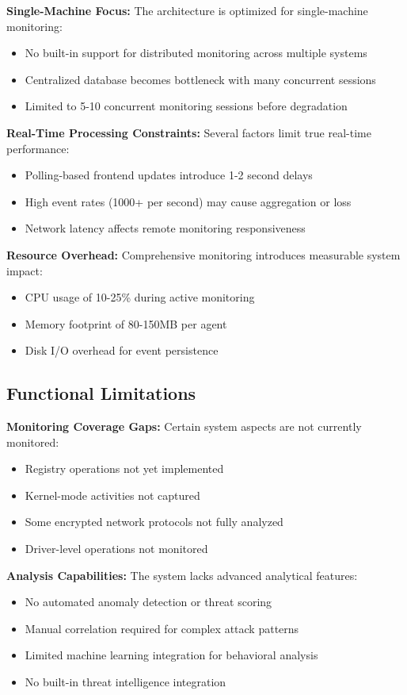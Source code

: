 \textbf{Single-Machine Focus:}
The architecture is optimized for single-machine monitoring:
\begin{itemize}
    \item No built-in support for distributed monitoring across multiple systems
    \item Centralized database becomes bottleneck with many concurrent sessions
    \item Limited to 5-10 concurrent monitoring sessions before degradation
\end{itemize}

\textbf{Real-Time Processing Constraints:}
Several factors limit true real-time performance:
\begin{itemize}
    \item Polling-based frontend updates introduce 1-2 second delays
    \item High event rates (1000+ per second) may cause aggregation or loss
    \item Network latency affects remote monitoring responsiveness
\end{itemize}

\textbf{Resource Overhead:}
Comprehensive monitoring introduces measurable system impact:
\begin{itemize}
    \item CPU usage of 10-25\% during active monitoring
    \item Memory footprint of 80-150MB per agent
    \item Disk I/O overhead for event persistence
\end{itemize}

\subsection{Functional Limitations}

\textbf{Monitoring Coverage Gaps:}
Certain system aspects are not currently monitored:
\begin{itemize}
    \item Registry operations not yet implemented
    \item Kernel-mode activities not captured
    \item Some encrypted network protocols not fully analyzed
    \item Driver-level operations not monitored
\end{itemize}

\textbf{Analysis Capabilities:}
The system lacks advanced analytical features:
\begin{itemize}
    \item No automated anomaly detection or threat scoring
    \item Manual correlation required for complex attack patterns
    \item Limited machine learning integration for behavioral analysis
    \item No built-in threat intelligence integration
\end{itemize}

